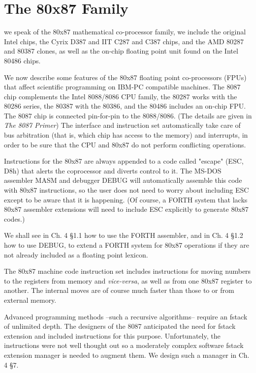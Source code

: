 
\chapter{The 80x87 Family}

 we speak of the 80x87 mathematical co-processor family, we include the original Intel chips, the Cyrix D387 and IIT C287 and C387 chips, and the AMD 80287 and 80387 clones, as well as the on-chip floating point unit found on the Intel 80486 chips.

We now describe some features of the 80x87 floating point co-processors (FPUs) that affect scientific programming on IBM-PC compatible machines. The 8087 chip complements the Intel 8088/8086 CPU family, the 80287 works with the 80286 series, the 80387 with the 80386, and the 80486 includes an on-chip FPU. The 8087 chip is connected pin-for-pin to the 8088/8086. (The details are given in \textit{The 8087 Primer}) The interface and instruction set automatically take care of bus arbitration (that is, which chip has access to the memory) and interrupts, in order to be sure that the CPU and 80x87 do not perform conflicting operations.

Instructions for the 80x87 are always appended to a code called "escape" (ESC, D8h) that alerts the coprocessor and diverts control to it. The MS-DOS assembler MASM and debugger DEBUG will automatically assemble this code with 80x87 instructions, so the user does not need to worry about including ESC except to be aware that it is happening. (Of course, a FORTH system that lacks 80x87 assembler extensions will need to include ESC explicitly to generate 80x87 codes.)

We shall see in Ch. 4 \S1.1 how to use the FORTH assembler, and in Ch. 4 \S1.2 how to use DEBUG, to extend a FORTH system for 80x87 operations if they are not already included as a floating point lexicon.

The 80x87 machine code instruction set includes instructions for moving numbers to the registers from memory and \textit{vice-versa}, as well as from one 80x87 register to another. The internal moves are of course much faster than those to or from external memory.

Advanced programming methods --such a recursive algorithms-- require an fstack of unlimited depth. The designers of the 8087 anticipated the need for fstack extension and included instructions for this purpose. Unfortunately, the instructions were not well thought out so a moderately complex software fstack extension manager is needed to augment them. We design such a manager in Ch. 4 \S7.

